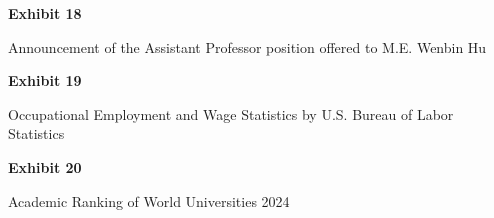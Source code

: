 \documentclass{article}
\begin{document}
% 

\vspace*{\fill}
\begin{center}

{\LARGE \bf
Exhibit 18
}

\vspace{10\baselineskip}

{\large Announcement of the Assistant Professor position offered to M.E. Wenbin Hu}

\end{center}
\vspace*{\fill}

% 


\vspace*{\fill}
\begin{center}

{\LARGE \bf
Exhibit 19
}

\vspace{10\baselineskip}

{\large Occupational Employment and Wage Statistics by U.S. Bureau of Labor Statistics}

\end{center}
\vspace*{\fill}

% 

% 

% 

% 




\vspace*{\fill}
\begin{center}
{\LARGE \bf
Exhibit 20
}

\vspace{10\baselineskip}

{\large Academic Ranking of World Universities 2024}

\end{center}
\vspace*{\fill}
\end{document}
